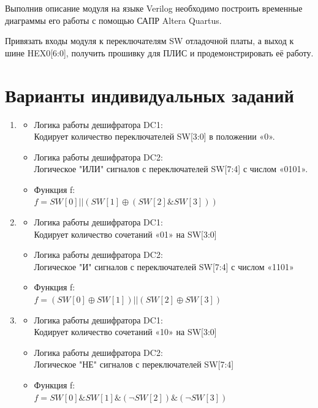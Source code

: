 \par{Выполнив описание модуля на языке Verilog необходимо построить временные диаграммы его работы с помощью САПР Altera Quartus.}
\par{Привязать входы модуля к переключателям SW отладочной платы, а выход к шине HEX0[6:0], получить прошивку для ПЛИС и продемонстрировать её работу.}


\section{Варианты индивидуальных заданий}


\begin{enumerate}
  
  \setlength\itemsep{1em}

  \item{
    \begin{itemize}
    \item Логика работы дешифратора DC1: \\
      Кодирует количество переключателей SW[3:0] в положении «0».
    \item Логика работы дешифратора DC2: \\ 
      Логическое "ИЛИ" сигналов с переключателей SW[7:4] с числом «0101».
    \item Функция f:\\
      $f = SW[0] || (SW[1] \oplus (SW[2] \& SW[3]))$
    \end{itemize}
  }

  \item{
    \begin{itemize}
    \item Логика работы дешифратора DC1: \\
      Кодирует количество сочетаний «01» на SW[3:0]
    \item Логика работы дешифратора DC2: \\ 
      Логическое "И" сигналов с переключателей SW[7:4] с числом «1101»
    \item Функция f:\\
      $f = (SW[0] \oplus  SW[1]) || (SW[2] \oplus  SW[3])$
    \end{itemize}
  }

    \item{
    \begin{itemize}
    \item Логика работы дешифратора DC1: \\
      Кодирует количество сочетаний «10» на SW[3:0]
    \item Логика работы дешифратора DC2: \\ 
      Логическое "НЕ" сигналов с переключателей SW[7:4]
    \item Функция f:\\
      $f = SW[0] \& SW[1] \& (\neg SW[2]) \& (\neg SW[3])$
    \end{itemize}
  }


\end{enumerate}

